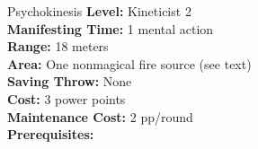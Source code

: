 {Psychokinesis}
{
	\textbf{Level:}
	Kineticist 2\\
	\textbf{Manifesting Time:}
	1 mental action\\
	\textbf{Range:}
	18 meters\\
	\textbf{Area:}
	One nonmagical fire source (see text)\\
	\textbf{Saving Throw:}
	None\\
	\textbf{Cost:}
	3 power points\\
	\textbf{Maintenance Cost:}
	2 pp/round\\
	\textbf{Prerequisites:}
	\\
}
{
	
}